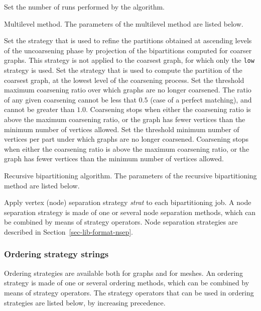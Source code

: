 \begin{itemize}
\begin{itemize}
\iteme[{\tt pass=}{\it nbr}]
Set the number of runs performed by the algorithm.
\end{itemize}
\iteme[{\tt m}]
Multilevel method. The parameters of the multilevel method are listed below.
\begin{itemize}
\iteme[{\tt asc=}{\it strat}]
Set the strategy that is used to refine the partitions obtained
at ascending levels of the uncoarsening phase by projection of the
bipartitions computed for coarser graphs.
This strategy is not applied to the coarsest graph, for which only the
{\tt low} strategy is used.
\iteme[{\tt low=}{\it strat}]
Set the strategy that is used to compute the partition of the
coarsest graph, at the lowest level of the coarsening process.
\iteme[{\tt rat=}{\it rat}]
Set the threshold maximum coarsening ratio over which graphs are no longer
coarsened. The ratio of any given coarsening cannot be less that $0.5$
(case of a perfect matching), and cannot be greater than $1.0$.
Coarsening stops when either the coarsening ratio is above the maximum
coarsening ratio, or the graph has fewer vertices than the minimum number of
vertices allowed.
\iteme[{\tt vert=}{\it nbr}]
Set the threshold minimum number of vertices per part under which
graphs are no longer coarsened. Coarsening stops when either the
coarsening ratio is above the maximum coarsening ratio, or the graph
has fewer vertices than the minimum number of vertices allowed.
\end{itemize}
\iteme[{\tt r}]
Recursive bipartitioning algorithm. The parameters of the recursive
bipartitioning method are listed below.
\begin{itemize}
\iteme[{\tt sep=}{\it strat}]
Apply vertex (node) separation strategy {\it strat\/} to each
bipartitioning job. A node separation strategy is made of one or
several node separation methods, which can be combined by means of
strategy operators. Node separation strategies are described in
Section~\ref{sec-lib-format-nsep}.
\end{itemize}
\end{itemize}

\subsubsection{Ordering strategy strings}
\label{sec-lib-format-ord}

Ordering strategies are available both for graphs and for meshes.
An ordering strategy is made of one or several ordering methods, which
can be combined by means of strategy operators. The strategy
operators that can be used in ordering strategies are listed below, by
increasing precedence.

